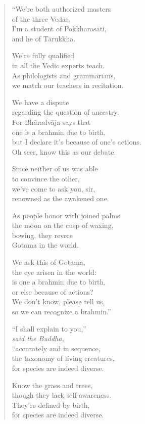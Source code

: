 \documentclass[12pt,openany]{book}%
\newcommand*{\scspeaker}[1]{\hspace{2em}\textit{#1}}
\begin{document}
\begin{verse}%
“We’re both authorized masters \\
of the three Vedas. \\
I’m a student of \textsanskrit{Pokkharasāti}, \\
and he of \textsanskrit{Tārukkha}. 

We’re fully qualified \\
in all the Vedic experts teach. \\
As philologists and grammarians, \\
we match our teachers in recitation. 

We have a dispute \\
regarding the question of ancestry. \\
For \textsanskrit{Bhāradvāja} says that \\
one is a brahmin due to birth, \\
but I declare it’s because of one’s actions. \\
Oh seer, know this as our debate. 

Since neither of us was able \\
to convince the other, \\
we’ve come to ask you, sir, \\
renowned as the awakened one. 

As people honor with joined palms \\
the moon on the cusp of waxing, \\
bowing, they revere \\
Gotama in the world. 

We ask this of Gotama, \\
the eye arisen in the world: \\
is one a brahmin due to birth, \\
or else because of actions? \\
We don’t know, please tell us, \\
so we can recognize a brahmin.” 

“I shall explain to you,” \\
\scspeaker{said the Buddha, }\\
“accurately and in sequence, \\
the taxonomy of living creatures, \\
for species are indeed diverse. 

Know the grass and trees, \\
though they lack self-awareness. \\
They’re defined by birth, \\
for species are indeed diverse. 


\end{verse}
\end{document}
